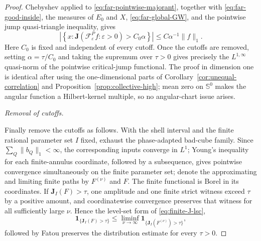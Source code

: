 \documentclass[11pt]{article}
\numberwithin{equation}{section}
\theoremstyle{remark}
\theoremstyle{definition}
\newcommand{\Sph}{\mathbb S}
\newcommand{\cF}{\mathcal F}
\newcommand{\norm}[1]{\lVert #1\rVert}
\begin{document}
\begin{proof}
Chebyshev applied to \eqref{eq:far-pointwise-majorant}, together with
\eqref{eq:far-good-inside}, the measures of $E_0$ and $X$,
\eqref{eq:far-global-GW}, and the pointwise jump quasi-triangle inequality,
gives
\[
 \left|\left\{x:\mathbf J(\cF^P_\varepsilon f:\varepsilon>0)
 >C_0\alpha\right\}\right|
 \le C\alpha^{-1}\norm f_1.
\]
Here $C_0$ is fixed and independent of every cutoff.  Once the cutoffs
are removed, setting $\alpha=\tau/C_0$ and taking the supremum over
$\tau>0$ gives precisely the $L^{1,\infty}$ quasi-norm of the pointwise
critical-jump functional.
The proof in dimension one is identical after using the one-dimensional
parts of Corollary~\ref{cor:unequal-correlation} and
Proposition~\ref{prop:collective-high}; mean zero on $\Sph^0$ makes the
angular function a Hilbert-kernel multiple, so no angular-chart issue
arises.

\smallskip
\noindent\emph{Removal of cutoffs.}

Finally remove the cutoffs as follows.  With the shell interval and the finite
rational parameter set \(I\) fixed, exhaust the phase-adapted bad-cube
family.
Since $\sum_Q\norm{b_Q}_1<\infty$, the corresponding inputs converge in
$L^1$; Young's inequality for each finite-annulus coordinate, followed by
a subsequence, gives pointwise convergence simultaneously on the finite
parameter set; denote the approximating and limiting finite paths by
$F^{(\nu)}$ and $F$.  The finite functional is Borel in its coordinates.
If \(\mathbf J_I(F)>\tau\), one amplitude and one finite strict witness
exceed \(\tau\) by a positive amount, and coordinatewise convergence
preserves that witness for all sufficiently large \(\nu\).  Hence the
level-set form of \eqref{eq:finite-J-lsc},
\[
 \mathbf1_{\{\mathbf J_I(F)>\tau\}}
 \le\liminf_{\nu\to\infty}
   \mathbf1_{\{\mathbf J_I(F^{(\nu)})>\tau\}},
\]
followed by Fatou preserves the distribution estimate for every
$\tau>0$.


\end{proof}
\end{document}
